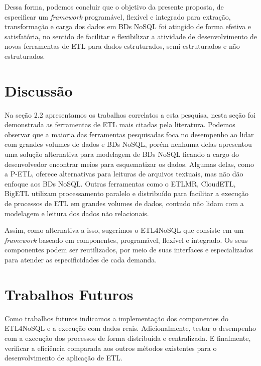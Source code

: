 Dessa forma, podemos concluir que o objetivo da presente proposta, de especificar um \textit{framework} programável, flexível e integrado para extração, transformação e carga dos dados em BDs NoSQL foi atingido de forma efetiva e satisfatória, no sentido de facilitar e flexibilizar a atividade de desenvolvimento de novas ferramentas de ETL para dados estruturados, semi estruturados e não estruturados.

\section{Discussão}

Na seção 2.2 apresentamos os trabalhos correlatos a esta pesquisa, nesta seção foi demonstrada as ferramentas de ETL mais citadas pela literatura. Podemos observar que a maioria das ferramentas pesquisadas foca no desempenho ao lidar com grandes volumes de dados e BDs NoSQL, porém nenhuma delas apresentou uma solução alternativa para modelagem de BDs NoSQL ficando a cargo do desenvolvedor encontrar meios para esquematizar os dados. Algumas delas, como a P-ETL, oferece alternativas para leituras de arquivos textuais, mas não dão enfoque aos BDs NoSQL.  Outras ferramentas como o ETLMR, CloudETL, BigETL utilizam processamento paralelo e distribuído para facilitar a execução de processos de ETL em grandes volumes de dados, contudo não lidam com a modelagem e leitura dos dados não relacionais.

Assim, como alternativa a isso, sugerimos o ETL4NoSQL que consiste em um \textit{framework} baseado em componentes, programável, flexível e integrado. Os seus componentes podem ser reutilizados, por meio de suas interfaces e especializados para atender as especificidades de cada demanda.


\section{Trabalhos Futuros}

Como trabalhos futuros indicamos a implementação dos componentes do ETL4NoSQL e a execução com dados reais. Adicionalmente, testar o desempenho com a execução dos processos de forma distribuída e centralizada. E finalmente, verificar a eficiência comparada aos outros métodos existentes para o desenvolvimento de aplicação de ETL.


